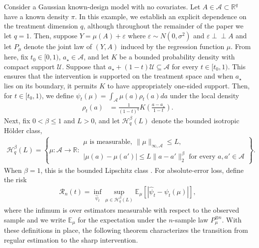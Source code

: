 \documentclass[11pt,twoside]{article}
\newcommand{\ind}{\perp\!\!\!\!\perp}
\def\ind{\perp\!\!\!\perp}
\theoremstyle{definition}
\theoremstyle{remark}
\begin{document}
Consider a Gaussian known-design model with no covariates. Let $A\in\mathcal{A}\subset\mathbb{R}^q$ have a known density $\pi$. In this example, we establish an explicit dependence on the treatment dimension $q$, although throughout the remainder of the paper we let $q=1$. Then, suppose $Y=\mu(A)+\varepsilon$ where $\varepsilon\sim N(0,\sigma^2)$ and $\varepsilon\ind A$ and let $P_\mu$ denote the joint law of $(Y, A)$ induced by the regression function $\mu$. From here, fix $t_0\in[0,1)$, $a_\star\in\mathcal{A}$, and let $K$ be a bounded probability density with compact support $\mathcal{U}$. Suppose that $a_\star+(1-t)\mathcal{U}\subseteq\mathcal{A}$ for every $t\in[t_0,1)$. This ensures that the intervention is supported on the treatment space and when $a_\star$ lies on its boundary, it permits $K$ to have appropriately one-sided support. Then, for $t\in[t_0,1)$, we define $\psi_t(\mu) = \int_{\mathcal{A}}\mu(a)\rho_t(a)da$ under the local density
\begin{align*}
    \rho_t(a) &= \frac{1}{(1-t)^q} K\left(\frac{a-a_\star}{1-t}\right).
\end{align*}
Next, fix $0 < \beta \leq 1$ and $L > 0$, and let $\mathcal{H}_q^\beta(L)$ denote the bounded isotropic H\"older class,
\begin{align*}
     \mathcal{H}_q^\beta(L)
    =
    \left\{
        \mu:\mathcal{A}\to\mathbb{R}:
        \begin{array}{l}
        \mu \text{ is measurable},\
        \|\mu\|_{\infty,\mathcal{A}}\leq L,\\[0.05in]
        |\mu(a)-\mu(a')|
        \leq
        L\|a-a'\|_2^\beta
        \text{ for every }a,a'\in\mathcal{A}
        \end{array}
    \right\}.
\end{align*}
When $\beta=1$, this is the bounded Lipschitz class \citep{tsbakov2009}. For absolute-error loss, define the risk
\begin{align*}
\mathcal{R}_n(t) = \inf_{\widehat\psi_t} \sup_{\mu\in\mathcal{H}_q^\beta(L)} \mathbb{E}_\mu \! \left[\left| \widehat\psi_t -  \psi_t(\mu) \right| \right],
\end{align*}
where the infimum is over estimators measurable with respect to the observed sample and we write $\mathbb{E}_\mu$ for the expectation under the $n$-sample law $P_\mu^{\otimes n}$. With these definitions in place, the following theorem characterizes the transition from regular estimation to the sharp intervention.
\end{document}
